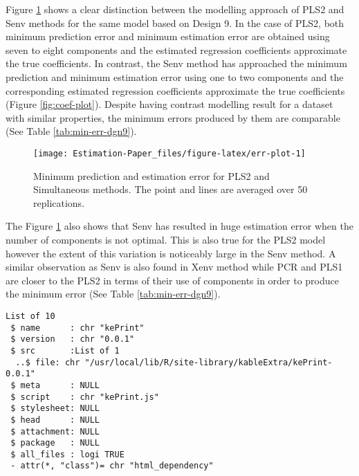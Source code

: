 \documentclass[12pt,3p,authoryear]{elsarticle}
\begin{document}
Figure \ref{fig:err-plot} shows a clear distinction between the
modelling approach of PLS2 and Senv methods for the same model based on
Design 9. In the case of PLS2, both minimum prediction error and minimum
estimation error are obtained using seven to eight components and the
estimated regression coefficients approximate the true coefficients. In
contrast, the Senv method has approached the minimum prediction and
minimum estimation error using one to two components and the
corresponding estimated regression coefficients approximate the true
coefficients (Figure \ref{fig:coef-plot}). Despite having contrast
modelling result for a dataset with similar properties, the minimum
errors produced by them are comparable (See Table
\ref{tab:min-err-dgn9}).

\begin{figure}
\texttt{[image: Estimation-Paper\_files/figure-latex/err-plot-1]} \caption{Minimum prediction and estimation error for PLS2 and Simultaneous methods. The point and lines are averaged over 50 replications.}\label{fig:err-plot}
\end{figure}

The Figure \ref{fig:err-plot} also shows that Senv has resulted in huge
estimation error when the number of components is not optimal. This is
also true for the PLS2 model however the extent of this variation is
noticeably large in the Senv method. A similar observation as Senv is
also found in Xenv method while PCR and PLS1 are closer to the PLS2 in
terms of their use of components in order to produce the minimum error
(See Table \ref{tab:min-err-dgn9}).

\begin{verbatim}
List of 10
 $ name      : chr "kePrint"
 $ version   : chr "0.0.1"
 $ src       :List of 1
  ..$ file: chr "/usr/local/lib/R/site-library/kableExtra/kePrint-0.0.1"
 $ meta      : NULL
 $ script    : chr "kePrint.js"
 $ stylesheet: NULL
 $ head      : NULL
 $ attachment: NULL
 $ package   : NULL
 $ all_files : logi TRUE
 - attr(*, "class")= chr "html_dependency"
\end{verbatim}
\end{document}
